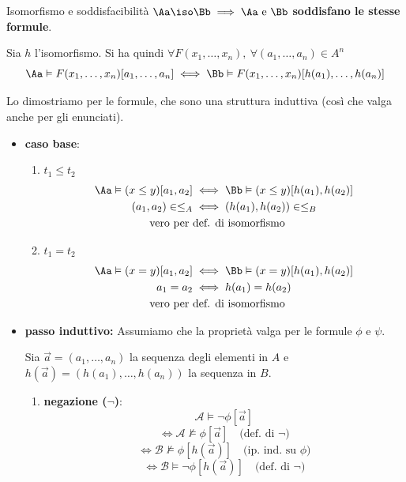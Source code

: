 \documentclass[a4paper,11pt]{report}
\begin{document}
\begin{thmframe}{Isomorfismo e soddisfacibilità}{}
    \( \Aa \iso \Bb \implies \Aa \text{ e } \Bb \) \textbf{soddisfano le stesse formule}.

    Sia \( h \) l'isomorfismo. Si ha quindi \( \forall F(x_1, \dots, x_n), \ \forall (a_1, \dots, a_n) \in A^n \)
    \[ \Aa \vDash F(x_1, \dots, x_n)[a_1, \dots, a_n] \iff  \Bb \vDash F(x_1, \dots, x_n)[h(a_1), \dots, h(a_n)]\]
\end{thmframe}

Lo dimostriamo per le formule, che sono una struttura induttiva (così che valga anche per gli enunciati).

\begin{pframe}
    \begin{itemize}
        \item \textbf{caso base}:
            \begin{enumerate}
                \item \( t_1 \leq t_2 \)
                    \begin{align*}
                        \Aa \vDash (x \leq y)[a_1, a_2] &\iff \Bb \vDash (x\leq y)[h(a_1), h(a_2)]\\
                        (a_1, a_2)\in \leq_A &\iff (h(a_1), h(a_2)) \in \leq_B \\
                    \text{vero per }& \text{def. di isomorfismo}
                    \end{align*}

                \item \( t_1 = t_2 \)
                    \begin{align*}
                        \Aa \vDash (x = y)[a_1, a_2] &\iff \Bb \vDash (x = y)[h(a_1), h(a_2)]\\
                        a_1 = a_2 &\iff h(a_1) = h(a_2) \\
                    \text{vero per }& \text{def. di isomorfismo}
                    \end{align*}

    \end{enumerate}
                    \item \textbf{passo induttivo:}
    Assumiamo che la proprietà valga per le formule \(\phi\) e \(\psi\). 

    Sia \(\vec{a} = (a_1, \ldots, a_n)\) la sequenza degli elementi in \(A\) e \(h(\vec{a}) = (h(a_1), \ldots, h(a_n))\) la sequenza in \(B\).

    \begin{enumerate}
        \item \textbf{negazione ($\neg$)}:
        \[ \mathcal{A} \models \neg \phi[\vec{a}] \]
        \[ \iff \mathcal{A} \not\models \phi[\vec{a}] \quad \text{(def. di } \neg) \]
        \[ \iff \mathcal{B} \not\models \phi[h(\vec{a})] \quad \text{(ip. ind. su } \phi) \]
        \[ \iff \mathcal{B} \models \neg \phi[h(\vec{a})] \quad \text{(def. di } \neg) \]


\end{enumerate}
\end{itemize}
\end{pframe}
\end{document}
